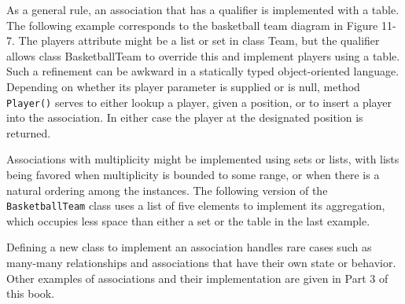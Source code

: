 As a general rule, an association that has a qualifier is implemented
with a table. The following example corresponds to
the basketball team diagram in Figure 11-7. The players attribute might
be a list or set in class Team, but the qualifier allows class
BasketballTeam to override this and implement players using a table.
Such a refinement can be awkward in a statically typed object-oriented
language.
Depending on whether its player parameter is supplied or is null, method
\texttt{Player()} serves to either lookup a player, given a position,
or to insert a player into the association. In either case the player
at the designated position is returned.


Associations with multiplicity might be implemented using sets or lists,
with lists being favored when multiplicity is bounded to some range, or
when there is a natural ordering among the instances. The following
version of the \texttt{BasketballTeam} class uses a list of five
elements to implement its aggregation, which occupies less space than
either a set or the table in the last example.


Defining a new class to implement an association handles
rare cases such as many-many relationships and associations that have
their own state or behavior. Other examples of associations and
their implementation are given in Part 3 of this book.

